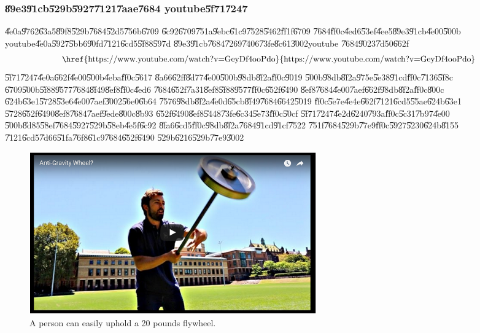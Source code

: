 \subsubsection{\U{89e3}\U{91cb}\U{529b}\U{5927}\U{7121}\U{7aae}\U{7684}%
youtube\U{5f71}\U{7247}}

\U{4e0a}\U{9762}\U{63a5}\U{89f8}\U{529b}\U{7684}\U{52d5}\U{756b}\U{6709}%
\U{6c92}\U{6709}\U{751a}\U{9ebc}\U{61c9}\U{7528}\U{5462}\U{ff1f}\U{6709}%
\U{7684}\U{ff0c}\U{4ed6}\U{53ef}\U{4ee5}\U{89e3}\U{91cb}\U{4e00}\U{500b}%
youtube\U{4e0a}\U{5927}\U{5bb6}\U{90fd}\U{7121}\U{6cd5}\U{5f88}\U{597d}%
\U{89e3}\U{91cb}\U{7684}\U{7269}\U{7406}\U{73fe}\U{8c61}\U{3002}youtube%
\U{7684}\U{9023}\U{7d50}\U{662f}%
\begin{equation*}
\text{\href{https://www.youtube.com/watch?v=GeyDf4ooPdo}{%
https://www.youtube.com/watch?v=GeyDf4ooPdo}}
\end{equation*}%
\U{5f71}\U{7247}\U{4e0a}\U{662f}\U{4e00}\U{500b}\U{4eba}\U{ff0c}\U{5617}%
\U{8a66}\U{62ff}\U{8d77}\U{4e00}\U{500b}\U{98db}\U{8f2a}\U{ff0c}\U{9019}%
\U{500b}\U{98db}\U{8f2a}\U{975e}\U{5e38}\U{91cd}\U{ff0c}\U{7136}\U{5f8c}%
\U{6709}\U{500b}\U{5f88}\U{9577}\U{7684}\U{8f49}\U{8ef8}\U{ff0c}\U{4ed6}%
\U{7684}\U{652f}\U{7a31}\U{8ef8}\U{5f88}\U{9577}\U{ff0c}\U{652f}\U{6490}%
\U{8ef8}\U{7684}\U{4e00}\U{7aef}\U{662f}\U{98db}\U{8f2a}\U{ff0c}\U{800c}%
\U{624b}\U{63e1}\U{5728}\U{53e6}\U{4e00}\U{7aef}\U{3002}\U{56e0}\U{6b64}%
\U{7576}\U{98db}\U{8f2a}\U{4e0d}\U{65cb}\U{8f49}\U{7684}\U{6642}\U{5019}%
\U{ff0c}\U{5e7e}\U{4e4e}\U{662f}\U{7121}\U{6cd5}\U{55ae}\U{624b}\U{63e1}%
\U{5728}\U{652f}\U{6490}\U{8ef8}\U{7684}\U{7aef}\U{9ede}\U{800c}\U{8b93}%
\U{652f}\U{6490}\U{8ef8}\U{5448}\U{73fe}\U{6c34}\U{5e73}\U{ff0c}\U{50cf}%
\U{5f71}\U{7247}\U{4e2d}\U{6240}\U{793a}\U{ff0c}\U{5c31}\U{7b97}\U{4e00}%
\U{500b}\U{8d85}\U{58ef}\U{7684}\U{5927}\U{529b}\U{58eb}\U{4e5f}\U{6c92}%
\U{8fa6}\U{6cd5}\U{ff0c}\U{98db}\U{8f2a}\U{7684}\U{91cd}\U{91cf}\U{7522}%
\U{751f}\U{7684}\U{529b}\U{77e9}\U{ff0c}\U{5927}\U{5230}\U{624b}\U{8155}%
\U{7121}\U{6cd5}\U{7d66}\U{51fa}\U{76f8}\U{61c9}\U{7684}\U{652f}\U{6490}%
\U{529b}\U{6216}\U{529b}\U{77e9}\U{3002}

\begin{figure}[th]
\caption{A person can easily uphold a 20 pounds flywheel.}
\begin{center}
\includegraphics[width=0.6\textwidth]{./figs/hercules.png}
\end{center}
\end{figure}

